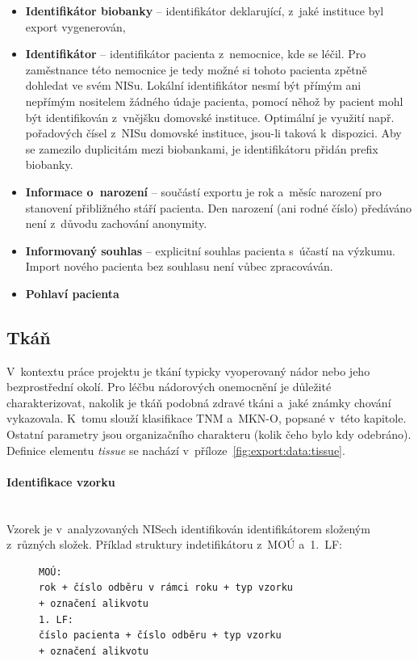 \documentclass[11pt, final, oneside]{fithesis2}
\newcommand{\polozka}[1]{\item {\bf #1}\xspace}
\newcommand{\paragraphNewLine}[1]{\paragraph*{#1}\mbox{}\\}
\begin{document}
\begin{itemize}
		\polozka{Identifikátor biobanky} -- identifikátor deklarující, z~jaké instituce byl export vygenerován,

		\polozka{Identifikátor} -- identifikátor pacienta z~nemocnice, kde se léčil. Pro zaměstnance této nemocnice je tedy možné si tohoto pacienta zpětně dohledat ve svém NISu. Lokální identifikátor nesmí být přímým ani nepřímým nositelem žádného údaje pacienta, pomocí něhož by pacient mohl být identifikován z~vnějšku domovské instituce. Optimální je využití např. pořadových čísel z~NISu domovské instituce, jsou-li taková k~dispozici. Aby se zamezilo duplicitám mezi biobankami, je identifikátoru přidán prefix biobanky.
		
		\polozka{Informace o~narození} -- součástí exportu je rok a~měsíc narození pro stanovení přibližného stáří pacienta. Den narození (ani rodné číslo) předáváno není z~důvodu zachování anonymity.
		
		\polozka{Informovaný souhlas} -- explicitní souhlas pacienta s~účastí na výzkumu. Import nového pacienta bez souhlasu není vůbec zpracováván.
			
		\polozka{Pohlaví pacienta}
		
	\end{itemize}



\subsection{Tkáň}
V~kontextu práce projektu je tkání typicky vyoperovaný nádor nebo jeho bezprostřední okolí. Pro léčbu nádorových onemocnění je důležité charakterizovat, nakolik je tkáň podobná zdravé tkáni a~jaké známky chování vykazovala. K~tomu slouží klasifikace TNM a~MKN-O, popsané v~této kapitole. Ostatní parametry jsou organizačního charakteru (kolik čeho bylo kdy odebráno).
Definice elementu \textit{tissue} se nachází v~příloze~\ref{fig:export:data:tissue}.

\paragraphNewLine{Identifikace vzorku}
Vzorek je v~analyzovaných NISech identifikován identifikátorem složeným z~různých složek.
Příklad struktury indetifikátoru z~MOÚ a~1.~LF:
\begin{figure}[ht!]
\centering
\begin{BVerbatim}
MOÚ: 
rok + číslo odběru v rámci roku + typ vzorku 
+ označení alikvotu
1. LF: 
číslo pacienta + číslo odběru + typ vzorku 
+ označení alikvotu
\end{BVerbatim}
\end{figure}
\end{document}
